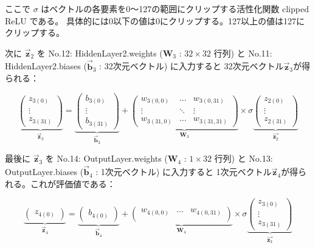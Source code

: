 \documentclass[11pt,a4paper]{ltjsarticle}
\begin{document}
\noindent
ここで $\sigma$ はベクトルの各要素を0〜127の範囲にクリップする活性化関数 clipped ReLU である。
具体的には0以下の値は0にクリップする。127以上の値は127にクリップする。


次に $\vec{\bm{z}}_2$ を
No.12: HiddenLayer2.weights ($\bm{W}_3$ : $32 \times 32$ 行列) と
No.11: HiddenLayer2.biases ($\vec{\bm{b}}_3$ : 32次元ベクトル) に入力すると
32次元ベクトル$\vec{\bm{z}}_3$が得られる：


\[
  \underbrace{\left(
    \begin{array}{c}
      z_{3(0)}  \\
      \vdots    \\
      z_{3(31)} 
    \end{array}  
  \right)}_{\vec{\bm{z}}_3}
  =
  \underbrace{\left(
    \begin{array}{c}
      b_{3(0)}  \\
      \vdots    \\
      b_{3(31)} 
    \end{array}  
  \right)}_{\vec{\bm{b}}_3}
  +
  \underbrace{\left(
    \begin{array}{ccc}
      w_{3(0,0)}   & \ldots & w_{3(0,31)} \\
      \vdots       & \ddots & \vdots \\
      w_{3(31,0)}  & \ldots & w_{3(31,31)}
    \end{array}
  \right)}_{\bm{W}_3}
  \times
  \sigma 
  \underbrace{\left(
    \begin{array}{c}
      z_{2(0)}   \\
      \vdots    \\
      z_{2(31)} 
    \end{array}  
  \right)}_{\vec{\bm{z}_2}}
\]

\pagebreak
最後に $\vec{\bm{z}}_3$ を
No.14: OutputLayer.weights ($\bm{W}_4$ : $1 \times 32$ 行列) と
No.13: OutputLayer.biases ($\vec{\bm{b}}_4$ : 1次元ベクトル) に入力すると
1次元ベクトル$\vec{\bm{z}}_4$が得られる。これが評価値である：

\[
  \underbrace{\left(
    \begin{array}{c}
      z_{4(0)}
    \end{array}  
  \right)}_{\vec{\bm{z}}_4}
  =
  \underbrace{\left(
    \begin{array}{c}
      b_{4(0)}
    \end{array}  
  \right)}_{\vec{\bm{b}}_4}
  +
  \underbrace{\left(
    \begin{array}{ccc}
      w_{4(0,0)}   & \ldots & w_{4(0,31)} \\
    \end{array}
  \right)}_{\bm{W}_4}
  \times
  \sigma 
  \underbrace{\left(
    \begin{array}{c}
      z_{3(0)}   \\
      \vdots    \\
      z_{3(31)} 
    \end{array}  
  \right)}_{\vec{\bm{z}_3}}
\]
\end{document}
